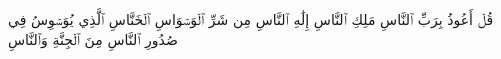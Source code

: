قُلۡ أَعُوذُ بِرَبِّ ٱلنَّاسِ
مَلِكِ ٱلنَّاسِ
إِلَٰهِ ٱلنَّاسِ
مِن شَرِّ ٱلۡوَسۡوَاسِ ٱلۡخَنَّاسِ
ٱلَّذِي يُوَسۡوِسُ فِي صُدُورِ ٱلنَّاسِ
مِنَ ٱلۡجِنَّةِ وَٱلنَّاسِ